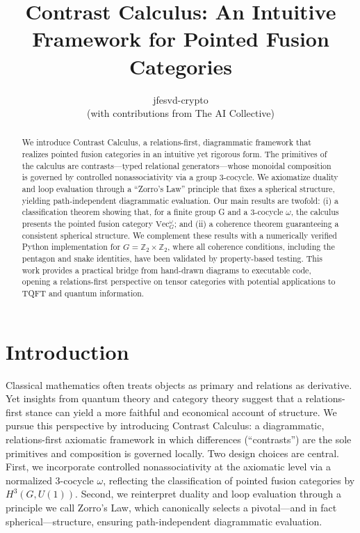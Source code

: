 \documentclass[11pt]{article}
\title{Contrast Calculus: An Intuitive Framework for Pointed Fusion Categories}
\author{jfesvd-crypto \\ (with contributions from The AI Collective)}
\date{}
\theoremstyle{definition}
\theoremstyle{remark}
\begin{document}
\maketitle

\begin{abstract}
We introduce Contrast Calculus, a relations-first, diagrammatic framework that realizes pointed fusion categories in an intuitive yet rigorous form. The primitives of the calculus are contrasts—typed relational generators—whose monoidal composition is governed by controlled nonassociativity via a group 3-cocycle. We axiomatize duality and loop evaluation through a “Zorro’s Law” principle that fixes a spherical structure, yielding path-independent diagrammatic evaluation. Our main results are twofold: (i) a classification theorem showing that, for a finite group G and a 3-cocycle $\omega$, the calculus presents the pointed fusion category $\mathrm{Vec}_G^\omega$; and (ii) a coherence theorem guaranteeing a consistent spherical structure. We complement these results with a numerically verified Python implementation for $G=\mathbb{Z}_2 \times \mathbb{Z}_2$, where all coherence conditions, including the pentagon and snake identities, have been validated by property-based testing. This work provides a practical bridge from hand-drawn diagrams to executable code, opening a relations-first perspective on tensor categories with potential applications to TQFT and quantum information.
\end{abstract}

\section{Introduction}
Classical mathematics often treats objects as primary and relations as derivative. Yet insights from quantum theory and category theory suggest that a relations-first stance can yield a more faithful and economical account of structure. We pursue this perspective by introducing Contrast Calculus: a diagrammatic, relations-first axiomatic framework in which differences (“contrasts”) are the sole primitives and composition is governed locally. Two design choices are central. First, we incorporate controlled nonassociativity at the axiomatic level via a normalized 3-cocycle $\omega$, reflecting the classification of pointed fusion categories by $H^3(G, U(1))$. Second, we reinterpret duality and loop evaluation through a principle we call Zorro’s Law, which canonically selects a pivotal—and in fact spherical—structure, ensuring path-independent diagrammatic evaluation.
\end{document}
